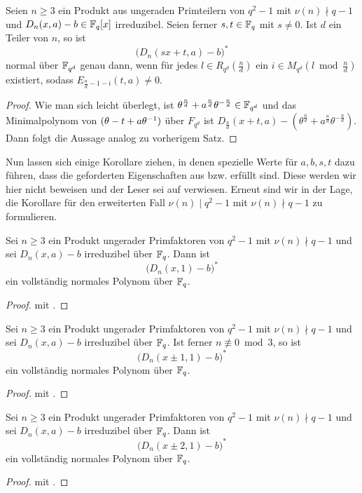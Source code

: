 \begin{satz}%
  \label{satz:scheerhorn4}
  Seien $n\geq 3$ ein Produkt aus ungeraden Primteilern von 
  $q^2-1$ mit $\nu(n)\nmid q-1$ und
  $D_n(x,a)-b \in \mathbb{F}_q[x]$ irreduzibel. Seien ferner $s,t\in \mathbb{F}_q$ mit
  $s\neq 0$. Ist $d$ ein Teiler von $n$, so ist
  \[ \big(D_n(sx+t,a)-b\big)^\ast\]
  normal über $\mathbb{F}_{q^d}$ genau dann, wenn für jedes 
  $l\in R_{q^d}(\tfrac n d)$ ein
  $i\in M_{q^d}(l\bmod \tfrac n d)$ existiert, sodass 
  $E_{\frac n d -1-i}(t,a)\neq 0$.
\end{satz}
\begin{proof}
  Wie man sich leicht überlegt, ist 
  $\theta^{\frac n d}+a^{\frac n d} \theta^{-\frac n d} \in \mathbb{F}_{q^d}$ 
  und das Minimalpolynom von 
  $(\theta -t+a\theta^{-1})$ über $F_{q^d}$ ist 
  $D_{\frac n d}(x+t,a) - (\theta^{\frac n d}+a^{\frac n d}\theta^{-\frac n
  d})$. Dann folgt die Aussage analog zu vorherigem Satz.
\end{proof}


Nun lassen sich einige Korollare ziehen, in denen spezielle Werte für $a,b,s,t$
dazu führen, dass die geforderten Eigenschaften aus 
 bzw.  erfüllt sind.
Diese werden wir hier nicht beweisen und der Leser sei auf
\autocite{scheerhorn:1997} verwiesen. Erneut sind wir in der Lage, die
Korollare für den erweiterten Fall $\nu(n)\mid q^2-1$ mit $\nu(n)\nmid q-1$ zu
formulieren.


\begin{kor}
  Sei $n\geq 3$ ein Produkt ungerader Primfaktoren von $q^2-1$ mit
  $\nu(n)\nmid q-1$ und sei
  $D_n(x,a) -b$ irreduzibel über $\mathbb{F}_q$. Dann ist
  \[ \big(D_n(x,1) -b\big)^\ast\]
  ein vollständig normales Polynom über $\mathbb{F}_q$.
\end{kor}
\begin{proof}
  \autocite[Corollary 1]{scheerhorn:1997} mit
  .
\end{proof}


\begin{kor}
  Sei $n\geq 3$ ein Produkt ungerader Primfaktoren von $q^2-1$
  mit $\nu(n)\nmid q-1$ und sei
  $D_n(x,a) -b$ irreduzibel über $\mathbb{F}_q$. Ist ferner $n\nequiv 0 \bmod 3$, so
  ist
  \[ \big(D_n(x\pm 1,1) -b\big)^\ast\]
  ein vollständig normales Polynom über $\mathbb{F}_q$.
\end{kor}
\begin{proof}
  \autocite[Corollary 2]{scheerhorn:1997} mit 
  .
\end{proof}

\begin{kor}
  Sei $n\geq 3$ ein Produkt ungerader Primfaktoren von $q^2-1$ mit
  $\nu(n)\nmid q-1$ und sei
  $D_n(x,a) -b$ irreduzibel über $\mathbb{F}_q$. Dann ist
  \[ \big(D_n(x\pm 2,1) -b\big)^\ast\]
  ein vollständig normales Polynom über $\mathbb{F}_q$.
\end{kor}
\begin{proof}
  \autocite[Corollary 3]{scheerhorn:1997} mit 
  .
\end{proof}



